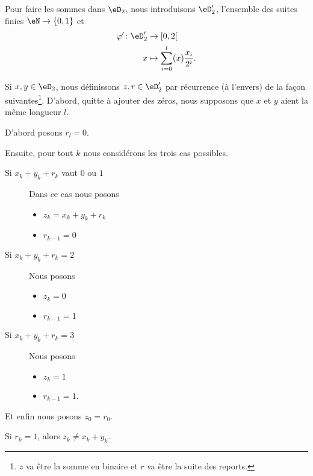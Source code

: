 Pour faire les sommes dans \( \eD_2\), nous introduisons \( \eD_2'\), l'ensemble des suites finies \( \eN\to \{ 0,1 \}\) et
\begin{equation}
	\begin{aligned}
		\varphi'\colon \eD'_2 & \to \mathopen[ 0,2\mathclose[               \\
		x                     & \mapsto \sum_{i=0}^l(x)\frac{ x_i }{ 2^i }.
	\end{aligned}
\end{equation}

\begin{definition}	\label{DEFooRJSFooDvbkrx}
	Si \( x,y\in \eD_2\), nous définissons \( z,r\in \eD_2'\) par récurrence (à l'envers) de la façon suivantes\footnote{\( z\) va être la somme en binaire et \( r\) va être la suite des reports.}. D'abord, quitte à ajouter des zéros, nous supposons que \( x\) et \( y\) aient la même longueur \( l\).

	D'abord posons \( r_l=0\).

	Ensuite, pour tout \( k\) nous considérons les trois cas possibles.
	\begin{description}
		\item[Si \( x_k+y_k+r_k\) vaut \( 0\) ou \( 1\)]
			Dans ce cas nous posons
			\begin{itemize}
				\item
				      \( z_k=x_k+y_k+r_k\)
				\item
				      \( r_{k-1}=0\)
			\end{itemize}
		\item[Si \( x_k+y_k+r_k=2\)]
			Nous posons
			\begin{itemize}
				\item
				      \( z_k=0\)
				\item
				      \( r_{k-1}=1\)
			\end{itemize}
		\item[Si \( x_k+y_k+r_k=3\)]
			Nous posons
			\begin{itemize}
				\item
				      \( z_k=1\)
				\item
				      \( r_{k-1}=1\).
			\end{itemize}
	\end{description}
	Et enfin nous posons \( z_0=r_0\).
\end{definition}

\begin{lemma}	\label{LEMooIUDHooNDlVtg}
	Si \( r_k=1\), alors \( z_k\neq x_k+y_k\).
\end{lemma}

